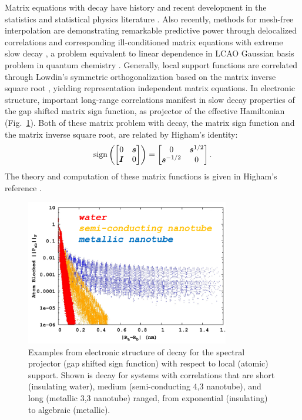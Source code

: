 \documentclass[letterpaper,twocolumn,amsmath,amsfont,amssymb,english,aps,jcp,preprintnumbers,groupaddress,nofootinbib,tightenlines,floatfix]{revtex4}
\newcommand{\mat}[1]{\boldsymbol{#1}}
\theoremstyle{plain}
\theoremstyle{remark}
\theoremstyle{plain}
\begin{document}
Matrix equations with decay have history and recent development in the statistics and statistical physics literature
\cite{penrose1974,voit00, Anselin2003, Hardin2013, Krishtal2014}.   Also recently, methods for mesh-free interpolation 
are demonstrating remarkable predictive power through delocalized correlations and corresponding 
ill-conditioned matrix equations with extreme slow decay \cite{Schaback1995,schaback2006kernel,Fornberg2014,sarra2014}, 
a problem equivalent to linear dependence in LCAO Gaussian basis problem 
in quantum chemistry \cite{Rothlisberger2002,Jansik2007,helgaker2008molecular}.  Generally, local support functions are correlated 
through Lowdin's symmetric orthogonalization based on the matrix inverse square root \cite{Lowdin56}, 
yielding representation independent matrix equations. 
In electronic structure, important long-range correlations manifest in slow decay properties 
of the gap shifted matrix sign function, as projector of the effective Hamiltonian (Fig.~\ref{figure1}).  
Both of these matrix problem with decay, the matrix sign function and the matrix inverse square root, 
are related by Higham's identity:
\begin{equation}\label{highamsid}
\rm{sign} \left( \begin{bmatrix} 0 & \mat{s}      \\ \mat{I}       & 0\end{bmatrix} \right)  =
                 \begin{bmatrix} 0 & \mat{s}^{1/2} \\ \mat{s}^{-1/2} & 0\end{bmatrix}  .
\end{equation}
The theory and computation of these matrix functions is given in Higham's reference \cite{Higham08}.

\begin{figure}[h]\label{figure1}
 \includegraphics[width=3.5in]{decay_picture.png}
  \caption{Examples from electronic structure of decay for the
    spectral projector (gap shifted sign function) with respect to
    local (atomic) support.  Shown is decay for systems with
    correlations that are short (insulating water), medium
    (semi-conducting 4,3 nanotube), and long (metallic 3,3 nanotube)
    ranged, from exponential (insulating) to algebraic (metallic). }
\end{figure}
\end{document}
